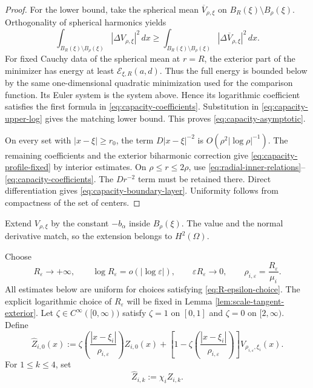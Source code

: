 \documentclass[11pt]{article}
\numberwithin{equation}{section}
\begin{document}
\begin{proof}
For the lower bound, take the spherical mean
$\overline V_{\rho,\xi}$ on
$B_R(\xi)\setminus B_\rho(\xi)$. Orthogonality of spherical
harmonics yields
\begin{equation*}
\int_{B_R(\xi)\setminus B_\rho(\xi)}
|\Delta V_{\rho,\xi}|^2\,dx
\geq
\int_{B_R(\xi)\setminus B_\rho(\xi)}
|\Delta\overline V_{\rho,\xi}|^2\,dx.
\end{equation*}
For fixed Cauchy data of the spherical mean at $r=R$, the exterior
part of the minimizer has energy at least
$\mathcal E_{\xi,R}(a,d)$. Thus the full energy is bounded below by
the same one-dimensional quadratic minimization used for the
comparison function. Its Euler system is the system above. Hence its
logarithmic coefficient satisfies the first formula in
\eqref{eq:capacity-coefficients}. Substitution in
\eqref{eq:capacity-upper-log} gives the matching lower bound. This
proves \eqref{eq:capacity-asymptotic}.

On every set with $|x-\xi|\geq r_0$, the term
$D|x-\xi|^{-2}$ is $O(\rho^2|\log\rho|^{-1})$. The remaining
coefficients and the exterior biharmonic correction give
\eqref{eq:capacity-profile-fixed} by interior estimates. On
$\rho\leq r\leq2\rho$, use
\eqref{eq:radial-inner-relations}--\eqref{eq:capacity-coefficients}.
The $Dr^{-2}$ term must be retained there. Direct differentiation
gives \eqref{eq:capacity-boundary-layer}. Uniformity follows from
compactness of the set of centers.
\end{proof}

Extend $V_{\rho,\xi}$ by the constant $-b_\alpha$ inside
$B_\rho(\xi)$. The value and the normal derivative match, so the
extension belongs to $H^2(\Omega)$.

Choose
\begin{equation}\label{eq:R-epsilon-choice}
R_\varepsilon\longrightarrow+\infty,
\qquad
\log R_\varepsilon=o(|\log\varepsilon|),
\qquad
\varepsilon R_\varepsilon\longrightarrow0,
\qquad
\rho_{i,\varepsilon}=\frac{R_\varepsilon}{\mu_i}.
\end{equation}
All estimates below are uniform for choices satisfying
\eqref{eq:R-epsilon-choice}. The explicit logarithmic choice of $R_\varepsilon$ will be fixed
in Lemma \ref{lem:scale-tangent-exterior}.
Let $\zeta\in C^\infty([0,\infty))$ satisfy
$\zeta=1$ on $[0,1]$ and $\zeta=0$ on $[2,\infty)$. Define
\begin{equation}\label{eq:dilation-test}
\widehat Z_{i,0}(x)
:=\zeta\left(\frac{|x-\xi_i|}{\rho_{i,\varepsilon}}\right)
Z_{i,0}(x)
+\left[1-\zeta\left(\frac{|x-\xi_i|}{\rho_{i,\varepsilon}}\right)\right]
V_{\rho_{i,\varepsilon},\xi_i}(x).
\end{equation}
For $1\leq k\leq4$, set
\begin{equation}\label{eq:translation-test}
\widehat Z_{i,k}:=\chi_iZ_{i,k}.
\end{equation}
\end{document}

